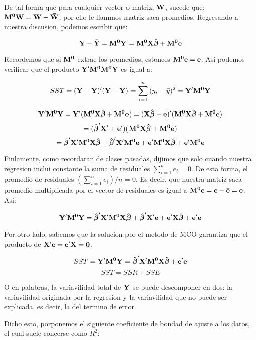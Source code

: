 \documentclass[
  a4paper,
]{article}
\begin{document}
De tal forma que para cualquier vector o matriz, \(\bf{W}\), sucede que:
\(\bf{M^0}\bf{W}= \bf{W} - \bar{\bf{W}}\), por ello le llammos matriz
saca promedios. Regresando a nuestra discusi\textquotesingle on, podemos
escribir que:

\[\bf{Y} - \bar{\bf{Y}} = \bf{M^0Y} = \bf{M^0X} \hat{\boldsymbol{\beta}} + \bf{M^0e}\]

Recordemos que si \(\bf{M^0}\) extrae los promedios, estonces
\(\bf{M^0e} = e\). As\textquotesingle i podemos verificar que el
producto \(\bf{Y'M^0}\bf{M^0Y}\) es igual a:

\[SST = ({\bf{Y}} - \bar{\bf{Y}})'({\bf{Y}} - \bar{\bf{Y}}) = \sum^{n}_{i=1}{(y_i - {\bar{y}})^2} = \bf{Y'M^0Y}\]

\[\bf{Y'M^0Y} = Y'(\bf{M^0X} \hat{\boldsymbol{\beta}} + \bf{M^0e}) = (\bf{X} \hat{\boldsymbol{\beta}} + \bf{e})'(\bf{M^0X} \hat{\boldsymbol{\beta}} + \bf{M^0e})\]
\[= (\hat{\boldsymbol{\beta}}' \bf{X'} + \bf{e'})(\bf{M^0X} \hat{\boldsymbol{\beta}} + \bf{M^0e}) \]
\[= \hat{\boldsymbol{\beta}}' \bf{X'}\bf{M^0X} \hat{\boldsymbol{\beta}} + \hat{\boldsymbol{\beta}}' \bf{X'}\bf{M^0e} + \bf{e'}\bf{M^0X} \hat{\boldsymbol{\beta}} + \bf{e'}\bf{M^0e}\]

Finlamente, como recordaran de clases pasadas, dijimos que
s\textquotesingle olo cuando nuestra regresi\textquotesingle on inclui
constante la suma de residuales \(\sum^{n}_{i=1}{e_i} = 0\). De esta
forma, el promedio de residuales \((\sum^{n}_{i=1}{e_i})/n = 0\). Es
decir, que nuestra matriz saca promedio multiplicada por el vector de
residuales es igual a \(\bf{M^0e} = e - \bar{e} = e\).
As\textquotesingle i:

\[\bf{Y'M^0Y} = \hat{\boldsymbol{\beta}}' \bf{X'}\bf{M^0X} \hat{\boldsymbol{\beta}} + \hat{\boldsymbol{\beta}}' \bf{X'}\bf{e} + \bf{e'}\bf{X} \hat{\boldsymbol{\beta}} + \bf{e'}\bf{e}\]

Por otro lado, sabemos que la soluci\textquotesingle on por el
m\textquotesingle etodo de MCO garantiza que el producto de
\(\bf{X'e} = \bf{e'X} = 0\).

\[SST = \bf{Y'M^0Y} = \hat{\boldsymbol{\beta}}' \bf{X'}\bf{M^0X} \hat{\boldsymbol{\beta}} + \bf{e'}\bf{e}\]
\[SST = SSR + SSE\]

O en palabras, la variavilidad total de \(\bf{Y}\) se puede descomponer
en dos: la variavilidad originada por la regresi\textquotesingle on y la
variavilidad que no puede ser explicada, es decir, la del
t\textquotesingle ermino de error.

Dicho esto, porponemos el siguiente coeficiente de bondad de ajuste a
los datos, el cual suele concerse como \(R^2\):
\end{document}
